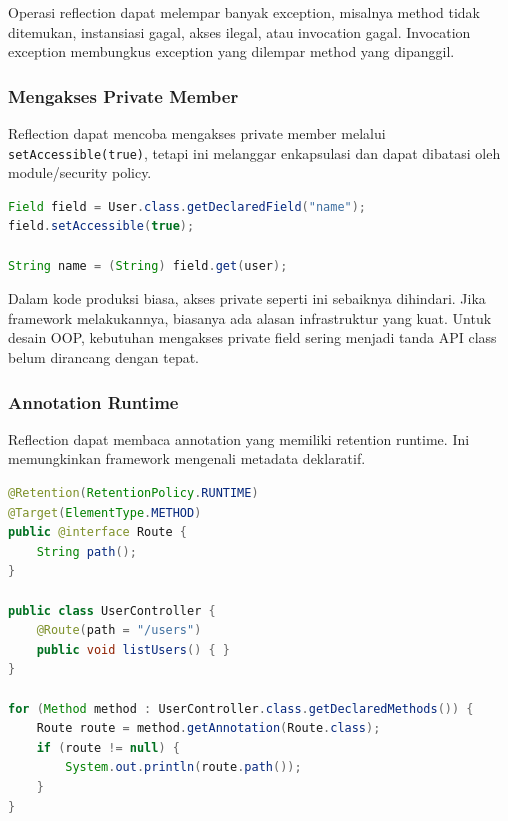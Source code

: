 Operasi reflection dapat melempar banyak exception, misalnya method tidak ditemukan, instansiasi gagal, akses ilegal, atau invocation gagal. Invocation exception membungkus exception yang dilempar method yang dipanggil.

\subsubsection{Mengakses Private Member}

\begin{jawab}
Reflection dapat mencoba mengakses private member melalui \texttt{setAccessible(true)}, tetapi ini melanggar enkapsulasi dan dapat dibatasi oleh module/security policy.
\end{jawab}

\begin{lstlisting}[language=Java, caption={Akses private field dengan reflection}, label={lst:private-reflection}]
Field field = User.class.getDeclaredField("name");
field.setAccessible(true);

String name = (String) field.get(user);
\end{lstlisting}

Dalam kode produksi biasa, akses private seperti ini sebaiknya dihindari. Jika framework melakukannya, biasanya ada alasan infrastruktur yang kuat. Untuk desain OOP, kebutuhan mengakses private field sering menjadi tanda API class belum dirancang dengan tepat.

\subsubsection{Annotation Runtime}

\begin{jawab}
Reflection dapat membaca annotation yang memiliki retention runtime. Ini memungkinkan framework mengenali metadata deklaratif.
\end{jawab}

\begin{lstlisting}[language=Java, caption={Annotation runtime dan pembacaannya}, label={lst:runtime-annotation}]
@Retention(RetentionPolicy.RUNTIME)
@Target(ElementType.METHOD)
public @interface Route {
    String path();
}

public class UserController {
    @Route(path = "/users")
    public void listUsers() { }
}

for (Method method : UserController.class.getDeclaredMethods()) {
    Route route = method.getAnnotation(Route.class);
    if (route != null) {
        System.out.println(route.path());
    }
}
\end{lstlisting}

